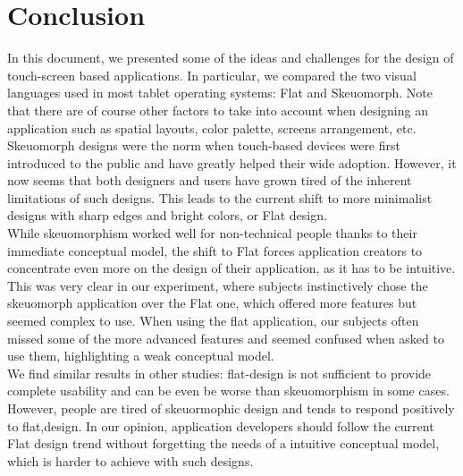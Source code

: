 \documentclass[a4paper,11pt] {article}
\theoremstyle{definition}
\begin{document}
\section{Conclusion}

In this document, we presented some of the ideas and challenges for the design of touch-screen based applications. In particular, we compared the two visual languages used in most tablet operating systems: Flat and Skeuomorph. Note that there are of course other factors to take into account when designing an application such as spatial layouts, color palette, screens arrangement, etc.\\

Skeuomorph designs were the norm when touch-based devices were first introduced to the public and have greatly helped their wide adoption. However, it now seems that both designers and users have grown tired of the inherent limitations of such designs. This leads to the current shift to more minimalist designs with sharp edges and bright colors, or Flat design.\\

While skeuomorphism worked well for non-technical people thanks to their immediate conceptual model, the shift to Flat forces application creators to concentrate even more on the design of their application, as it has to be intuitive. This was very clear in our experiment, where subjects instinctively chose the skeuomorph application over the Flat one, which offered more features but seemed complex to use. When using the flat application, our subjects often missed some of the more advanced features and seemed confused when asked to use them, highlighting a weak conceptual model.\\

We find similar results in other studies: flat-design is not sufficient to provide complete usability and can be even be worse than skeuomorphism in some cases. However, people are tired of skeuormophic design and tends to respond positively to flat,design. In our opinion, application developers should follow the current Flat design trend without forgetting the needs of a intuitive conceptual model, which is harder to achieve with such designs.
\newpage
\appendix
\end{document}

